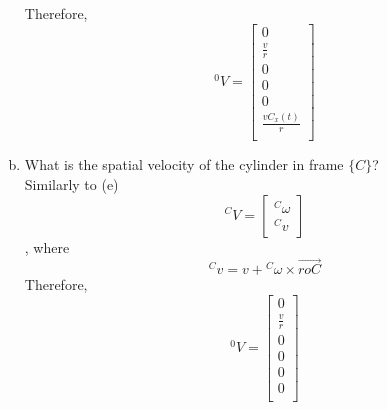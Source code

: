 \begin{enumerate}[(a)]
    Therefore, \[{}^0V = \begin{bmatrix}
        0 \\ \frac{v}{r} \\ 0 \\ 0 \\ 0 \\ \frac{vC_x(t)}{r} \\
    \end{bmatrix}\]
    \item What is the spatial velocity of the cylinder in frame $\{C\}$?\\
    Similarly to (e)\[{}^CV = \begin{bmatrix}
        {}^C\omega \\ {}^Cv
    \end{bmatrix}\], where
    \[{}^Cv = v + {}^C\omega \times \overrightarrow{roC}\]
    Therefore, \[{}^0V = \begin{bmatrix}
        0 \\ \frac{v}{r} \\ 0 \\ 0 \\ 0 \\ 0 \\
    \end{bmatrix}\]
\end{enumerate}
